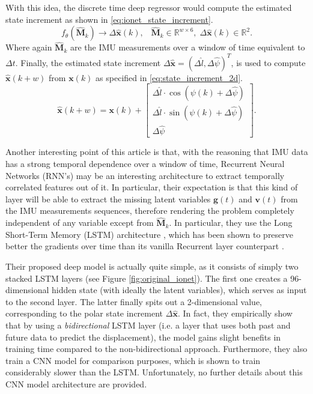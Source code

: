 With this idea, the discrete time deep regressor would compute the estimated state increment as shown in \ref{eq:ionet_state_increment}.
\begin{equation}\label{eq:ionet_state_increment}
    f_\theta(\mathbf{\hat{M}}_{k}) \rightarrow \Delta\mathbf{\hat{x}}(k), \;\;\; \mathbf{\hat{M}}_{k}\in\mathbb{R}^{w\times6}, \;\Delta\mathbf{\hat{x}}(k)\in\mathbb{R}^{2}.
\end{equation}
Where again $\mathbf{\hat{M}}_{k}$ are the IMU measurements over a window of time equivalent to $\Delta t$. Finally, the estimated state increment $\Delta\mathbf{\hat{x}}=(\Delta \hat{l}, \Delta \hat{\psi})^{T}$, is used to compute $\mathbf{\hat{x}}(k+w)$ from $\mathbf{x}(k)$ as specified in \ref{eq:state_increment_2d}.
 \begin{equation}\label{eq:state_increment_2d}
     \mathbf{\hat{x}}(k+w)=\mathbf{x}(k) +
    \begin{bmatrix} 
    \Delta \hat{l}\cdot\cos\left(\psi(k)+\Delta\hat{\psi}\right) \\
    \Delta \hat{l}\cdot\sin\left(\psi(k)+\Delta\hat{\psi}\right) \\ 
    \Delta\hat{\psi} 
    \end{bmatrix}.
 \end{equation}

Another interesting point of this article is that, with the reasoning that IMU data has a strong temporal dependence over a window of time, Recurrent Neural Networks (RNN's) may be an interesting architecture to extract temporally correlated features out of it.
In particular, their expectation is that this kind of layer will be able to extract the missing latent variables $\mathbf{g}(t)$ and $\mathbf{v}(t)$ from the IMU measurements sequences, therefore rendering the problem completely independent of any variable except from $\mathbf{\hat{M}}_{k}$.
In particular, they use the Long Short-Term Memory (LSTM) architecture \cite{hochreiter1997long}, which has been shown to preserve better the gradients over time than its vanilla Recurrent layer counterpart \cite{DBLP:journals/corr/GreffSKSS15}. 

Their proposed deep model is actually quite simple, as it consists of simply two stacked LSTM layers (see Figure \ref{fig:original_ionet}). 
The first one creates a 96-dimensional hidden state (with ideally the latent variables), which serves as input to the second layer. 
The latter finally spits out a 2-dimensional value, corresponding to the polar state increment $\Delta\mathbf{\hat{x}}$. 
In fact, they empirically show that by using a \emph{bidirectional} LSTM layer (i.e. a layer that uses both past and future data to predict the displacement), the model gains slight benefits in training time compared to the non-bidirectional approach. 
Furthermore, they also train a CNN model for comparison purposes, which is shown to train considerably slower than the LSTM. 
Unfortunately, no further details about this CNN model architecture are provided.

